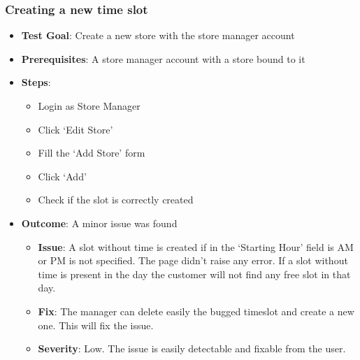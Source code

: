 \subsubsection{Creating a new time slot}
\begin{itemize}
    \item \textbf{Test Goal}: Create a new store with the store manager account
    \item \textbf{Prerequisites}: A store manager account with a store bound to it
    \item \textbf{Steps}:
    \begin{itemize}
        \item Login as Store Manager
        \item Click `Edit Store'
        \item Fill the `Add Store' form
        \item Click `Add'
        \item Check if the slot is correctly created
    \end{itemize}
    \item \textbf{Outcome}:  A minor issue was found
    \begin{itemize}
        \item \textbf{Issue}: A slot without time is created if in the `Starting Hour' field is AM or PM is not specified. The page didn't raise any error. 
            If a slot without time is present in the day the customer will not find any free slot in that day.
        \item \textbf{Fix}: The manager can delete easily the bugged timeslot and create a new one. This will fix the issue.
        \item \textbf{Severity}: Low. The issue is easily detectable and fixable from the user.
    \end{itemize}
\end{itemize} 
